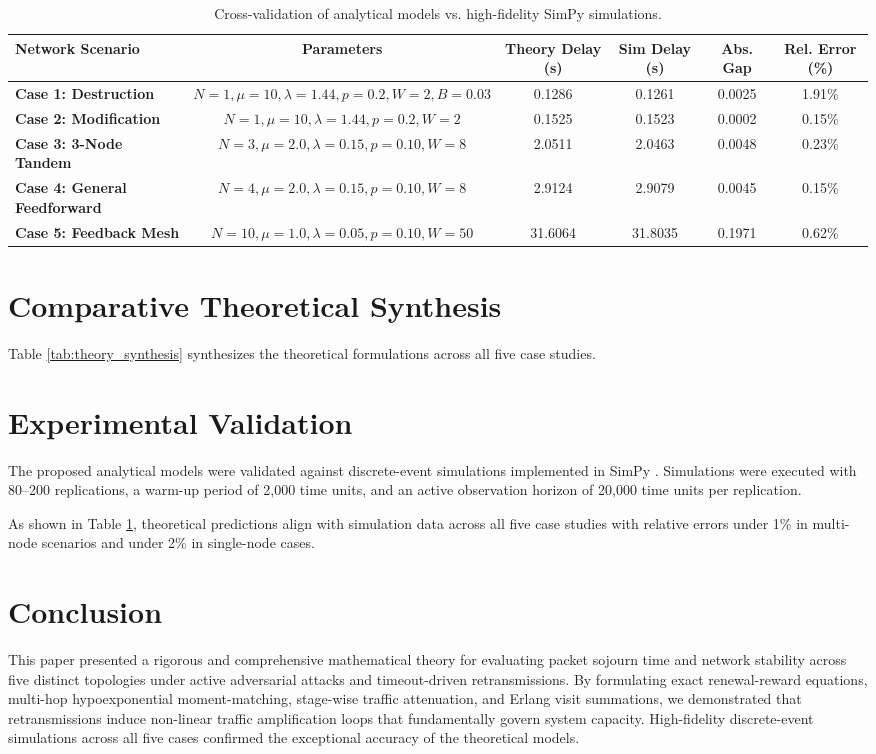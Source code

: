 \documentclass[journal,compsoc]{IEEEtran}
\begin{document}
\begin{table}[t]
\centering
\caption{Cross-validation of analytical models vs. high-fidelity SimPy simulations.}
\begin{tabular}{@{}lccccc@{}}
\toprule
\textbf{Network Scenario} & \textbf{Parameters} & \textbf{Theory Delay (s)} & \textbf{Sim Delay (s)} & \textbf{Abs. Gap} & \textbf{Rel. Error (\%)} \\ \midrule
\textbf{Case 1: Destruction} & $N=1, \mu=10, \lambda=1.44, p=0.2, W=2, B=0.03$ & 0.1286 & 0.1261 & 0.0025 & 1.91\% \\
\textbf{Case 2: Modification} & $N=1, \mu=10, \lambda=1.44, p=0.2, W=2$ & 0.1525 & 0.1523 & 0.0002 & 0.15\% \\
\textbf{Case 3: 3-Node Tandem} & $N=3, \mu=2.0, \lambda=0.15, p=0.10, W=8$ & 2.0511 & 2.0463 & 0.0048 & 0.23\% \\
\textbf{Case 4: General Feedforward} & $N=4, \mu=2.0, \lambda=0.15, p=0.10, W=8$ & 2.9124 & 2.9079 & 0.0045 & 0.15\% \\
\textbf{Case 5: Feedback Mesh} & $N=10, \mu=1.0, \lambda=0.05, p=0.10, W=50$ & 31.6064 & 31.8035 & 0.1971 & 0.62\% \\ \bottomrule
\end{tabular}
\label{tab:validation}
\end{table}

\section{Comparative Theoretical Synthesis}
Table \ref{tab:theory_synthesis} synthesizes the theoretical formulations across all five case studies.

\section{Experimental Validation}
The proposed analytical models were validated against discrete-event simulations implemented in SimPy \cite{matloff2008introduction}. Simulations were executed with 80–200 replications, a warm-up period of 2,000 time units, and an active observation horizon of 20,000 time units per replication. 

As shown in Table \ref{tab:validation}, theoretical predictions align with simulation data across all five case studies with relative errors under 1\% in multi-node scenarios and under 2\% in single-node cases.

\section{Conclusion}
This paper presented a rigorous and comprehensive mathematical theory for evaluating packet sojourn time and network stability across five distinct topologies under active adversarial attacks and timeout-driven retransmissions. By formulating exact renewal-reward equations, multi-hop hypoexponential moment-matching, stage-wise traffic attenuation, and Erlang visit summations, we demonstrated that retransmissions induce non-linear traffic amplification loops that fundamentally govern system capacity. High-fidelity discrete-event simulations across all five cases confirmed the exceptional accuracy of the theoretical models.
\end{document}
